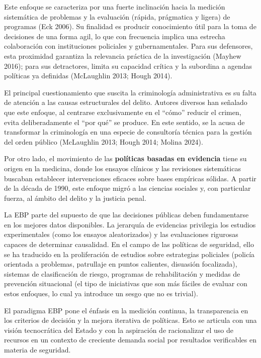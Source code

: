 \documentclass[
  spanish,
  letterpaper,
  DIV=11,
  numbers=noendperiod]{scrreprt}
\begin{document}
Este enfoque se caracteriza por una fuerte inclinación hacia la medición
sistemática de problemas y la evaluación (rápida, prágmatica y ligera)
de programas (Eck 2006). Su finalidad es producir conocimiento útil para
la toma de decisiones de una forma agil, lo que con frecuencia implica
una estrecha colaboración con instituciones policiales y
gubernamentales. Para sus defensores, esta proximidad garantiza la
relevancia práctica de la investigación (Mayhew 2016); para sus
detractores, limita su capacidad crítica y la subordina a agendas
políticas ya definidas (McLaughlin 2013; Hough 2014).

El principal cuestionamiento que suscita la criminología administrativa
es su falta de atención a las causas estructurales del delito. Autores
diversos han señalado que este enfoque, al centrarse exclusivamente en
el ``cómo'' reducir el crimen, evita deliberadamente el ``por qué'' se
produce. En este sentido, se la acusa de transformar la criminología en
una especie de consultoría técnica para la gestión del orden público
(McLaughlin 2013; Hough 2014; Molina 2024).

Por otro lado, el movimiento de las \textbf{políticas basadas en
evidencia} tiene su origen en la medicina, donde los ensayos clínicos y
las revisiones sistemáticas buscaban establecer intervenciones eficaces
sobre bases empíricas sólidas. A partir de la década de 1990, este
enfoque migró a las ciencias sociales y, con particular fuerza, al
ámbito del delito y la justicia penal.

La EBP parte del supuesto de que las decisiones públicas deben
fundamentarse en los mejores datos disponibles. La jerarquía de
evidencias privilegia los estudios experimentales (como los ensayos
aleatorizados) y las evaluaciones rigurosas capaces de determinar
causalidad. En el campo de las políticas de seguridad, ello se ha
traducido en la proliferación de estudios sobre estrategias policiales
(policía orientada a problemas, patrullaje en puntos calientes,
disuasión focalizada), sistemas de clasificación de riesgo, programas de
rehabilitación y medidas de prevención situacional (el tipo de
iniciativas que son más fáciles de evaluar con estos enfoques, lo cual
ya introduce un sesgo que no es trivial).

El paradigma EBP pone el énfasis en la medición continua, la
transparencia en los criterios de decisión y la mejora iterativa de
políticas. Esto se articula con una visión tecnocrática del Estado y con
la aspiración de racionalizar el uso de recursos en un contexto de
creciente demanda social por resultados verificables en materia de
seguridad.
\end{document}
